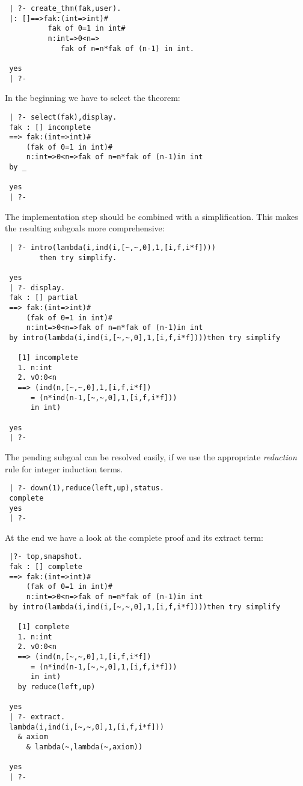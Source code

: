 \documentclass[11pt]{report}
\begin{document}
 \small\begin{verbatim}
 | ?- create_thm(fak,user).
 |: []==>fak:(int=>int)#
          fak of 0=1 in int#
          n:int=>0<n=>
             fak of n=n*fak of (n-1) in int.
 
 yes
 | ?- \end{verbatim}\normalsize
 In the beginning we have to select the theorem:
 \small\begin{verbatim}
 | ?- select(fak),display.
 fak : [] incomplete 
 ==> fak:(int=>int)#
     (fak of 0=1 in int)#
     n:int=>0<n=>fak of n=n*fak of (n-1)in int
 by _
 
 yes
 | ?- \end{verbatim}\normalsize
 The implementation step should be combined with a simplification.
 This makes the resulting subgoals more comprehensive:
 \small\begin{verbatim}
 | ?- intro(lambda(i,ind(i,[~,~,0],1,[i,f,i*f])))  
        then try simplify.
 
 yes
 | ?- display.
 fak : [] partial 
 ==> fak:(int=>int)#
     (fak of 0=1 in int)#
     n:int=>0<n=>fak of n=n*fak of (n-1)in int
 by intro(lambda(i,ind(i,[~,~,0],1,[i,f,i*f])))then try simplify
 
   [1] incomplete
   1. n:int
   2. v0:0<n
   ==> (ind(n,[~,~,0],1,[i,f,i*f])
      = (n*ind(n-1,[~,~,0],1,[i,f,i*f]))
      in int)
 
 yes
 | ?- \end{verbatim}\normalsize
 The pending subgoal can be resolved easily, if we use the
 appropriate \emph{reduction} rule for integer induction terms.
 \small\begin{verbatim}
 | ?- down(1),reduce(left,up),status.
 complete
 yes
 | ?- \end{verbatim}\normalsize
 At the end we have a look at the complete proof and its
 extract term:
 \small\begin{verbatim}
 |?- top,snapshot.
 fak : [] complete 
 ==> fak:(int=>int)#
     (fak of 0=1 in int)#
     n:int=>0<n=>fak of n=n*fak of (n-1)in int
 by intro(lambda(i,ind(i,[~,~,0],1,[i,f,i*f])))then try simplify
 
   [1] complete
   1. n:int
   2. v0:0<n
   ==> (ind(n,[~,~,0],1,[i,f,i*f])
      = (n*ind(n-1,[~,~,0],1,[i,f,i*f]))
      in int)
   by reduce(left,up)
 
 yes
 | ?- extract.
 lambda(i,ind(i,[~,~,0],1,[i,f,i*f]))
   & axiom
     & lambda(~,lambda(~,axiom))
 
 yes
 | ?- \end{verbatim}\normalsize
\end{document}
